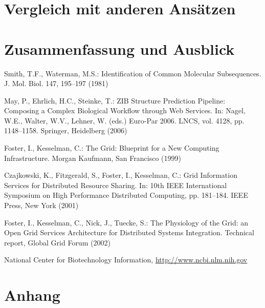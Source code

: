 \documentclass[runningheads,a4paper]{llncs}
\begin{document}
\section{Vergleich mit anderen Ansätzen} \label{bewertung}


\section{Zusammenfassung und Ausblick} \label{zusammenfassung-ausblick}





\begin{thebibliography}{4}

 Smith, T.F., Waterman, M.S.: Identification of Common Molecular
Subsequences. J. Mol. Biol. 147, 195--197 (1981)

 May, P., Ehrlich, H.C., Steinke, T.: ZIB Structure Prediction Pipeline:
Composing a Complex Biological Workflow through Web Services. In: Nagel,
W.E., Walter, W.V., Lehner, W. (eds.) Euro-Par 2006. LNCS, vol. 4128,
pp. 1148--1158. Springer, Heidelberg (2006)

 Foster, I., Kesselman, C.: The Grid: Blueprint for a New Computing
Infrastructure. Morgan Kaufmann, San Francisco (1999)

 Czajkowski, K., Fitzgerald, S., Foster, I., Kesselman, C.: Grid
Information Services for Distributed Resource Sharing. In: 10th IEEE
International Symposium on High Performance Distributed Computing, pp.
181--184. IEEE Press, New York (2001)

 Foster, I., Kesselman, C., Nick, J., Tuecke, S.: The Physiology of the
Grid: an Open Grid Services Architecture for Distributed Systems
Integration. Technical report, Global Grid Forum (2002)

 National Center for Biotechnology Information, \url{http://www.ncbi.nlm.nih.gov}

\end{thebibliography}


\section*{Anhang}

\end{document}
